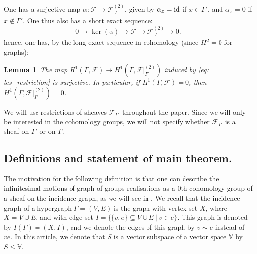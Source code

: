 \documentclass{article}
\newtheorem{lemma}[theorem]{Lemma}
\theoremstyle{definition}
\theoremstyle{remark}
\begin{document}
One has a surjective map $\alpha: \mathcal{F}\rightarrow \mathcal{F}_{\vert \Gamma}^{(2)}$, given by $\alpha_{x} = \textup{id}$ if $x\in \Gamma'$, and $\alpha_{x} = 0$ if $x\notin \Gamma'$. One thus also has a short exact sequence:
\begin{equation}\label{eq: les_restriction}
0 \rightarrow \ker(\alpha) \rightarrow \mathcal{F}\rightarrow \mathcal{F}_{\vert \Gamma}^{(2)} \rightarrow 0.
\end{equation}
hence, one has, by the long exact sequence in cohomology (since $H^{2}=0$ for graphs):
\begin{lemma} \label{lem: Stresses extend}
The map $H^{1}(\Gamma, \mathcal{F}) \rightarrow H^{1}(\Gamma, \mathcal{F}\vert_{\Gamma'}^{(2)})$ induced by \eqref{eq: les_restriction} is surjective. In particular, if $H^{1}(\Gamma, \mathcal{F})= 0$, then $ H^{1}(\Gamma, \mathcal{F}\vert_{\Gamma'}^{(2)})=0$.
\end{lemma}

We will use restrictions of sheaves $\mathcal{F}_{\Gamma'}$ throughout the paper. Since we will only be interested in the cohomology groups, we will not specify whether $\mathcal{F}_{\Gamma'}$ is a sheaf on $\Gamma'$ or on $\Gamma$. 



\subsection{Definitions and statement of main theorem.}

The motivation for the following definition is that one can describe the infinitesimal motions of graph-of-groups realisations as a $0$th cohomology group of a sheaf on the incidence graph, as we will see in . We recall that the incidence graph of a hypergraph $\Gamma=(V, E)$ is the graph with vertex set $X$, where $X= V\cup E$, and with edge set $I = \{\{v,e\} \subseteq V\cup E ~ |~ v \in e \}$. This graph is denoted by $I(\Gamma) = (X, I)$, and we denote the edges of this graph by $v\sim e$ instead of $ve$. In this article, we denote that $S$ is a vector subspace of a vector space $\mathbb{V}$ by $S\leq \mathbb{V}$.
\end{document}
